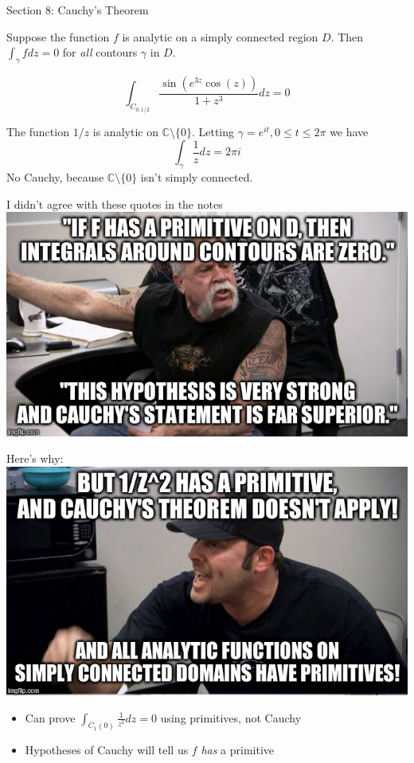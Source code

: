 \documentclass{beamer}
\newcommand{\C}{\mathbb{C}}
\begin{document}
\begin{frame}{Section 8: Cauchy's Theorem}

\begin{theorem} Suppose the function $f$ is analytic on a \alert{simply connected} region $D$.  Then $\int_\gamma fdz=0$ for \emph{all} contours $\gamma$ in $D$.
\end{theorem}
\begin{example}
$$\int_{C_{0,1/2}} \frac{\sin(e^{3z}\cos(z))}{1+z^3}dz=0$$
\end{example}

\begin{example}
The function $1/z$ is analytic on $\C\setminus\{0\}$.  Letting $\gamma=e^{it}, 0\leq t\leq 2\pi$ we have 
$$\int_\gamma \frac{1}{z} dz=2\pi i$$
No Cauchy, because $\C\setminus\{0\}$ isn't simply connected.
\end{example}
\end{frame}
\begin{frame}{I didn't agree with these quotes in the notes}\includegraphics[width=\textwidth,height=0.8\textheight,keepaspectratio]{ChopperFilled1.jpg}
\end{frame}
\begin{frame}{Here's why:}\includegraphics[width=\textwidth,height=0.8\textheight,keepaspectratio]{ChopperFilled2.jpg}
\begin{itemize}
    \item Can prove $\int_{C_1(0)}\frac{1}{z^2}dz=0$ using primitives, not Cauchy
    \item Hypotheses of Cauchy will tell us $f$ \emph{has} a primitive
\end{itemize}
\end{frame}
\end{document}
